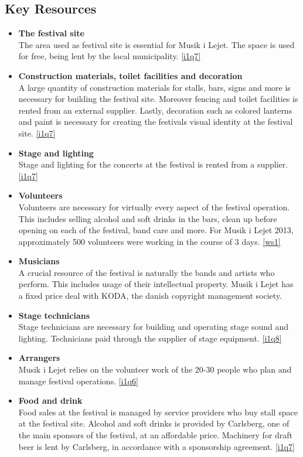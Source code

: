 \subsection{Key Resources} %
\label{sub:key_resources}
\begin{itemize}
	\item \textbf{The festival site}\\
	The area used as festival site is essential for Musik i Lejet. The space is used for free, being lent by the local municipality. \ref{i1q7}
	\item \textbf{Construction materials, toilet facilities and decoration}\\ 
	A large quantity of construction materials for stalls, bars, signs and more is necessary for building the festival site. Moreover fencing and toilet facilities is rented from an external supplier. Lastly, decoration such as colored lanterns and paint is necessary for creating the festivals visual identity at the festival site. \ref{i1q7}
	\item \textbf{Stage and lighting}\\
	Stage and lighting for the concerts at the festival is rented from a supplier. \ref{i1q7}
	\item \textbf{Volunteers}\\
	Volunteers are necessary for virtually every aspect of the festival operation. This includes selling alcohol and soft drinks in the bars, clean up before opening on each of the festival, band care and more. For Musik i Lejet 2013, approximately 500 volunteers were working in the course of 3 days. \ref{ws1}
	\item \textbf{Musicians}\\
	A crucial resource of the festival is naturally the bands and artists who perform. This includes usage of their intellectual property. Musik i Lejet has a fixed price deal with KODA, the danish copyright management society.
	\item \textbf{Stage technicians}\\
	Stage technicians are necessary for building and operating stage sound and lighting. Technicians paid through the supplier of stage equipment. \ref{i1q8}
	\item \textbf{Arrangers}\\
	Musik i Lejet relies on the volunteer work of the 20-30 people who plan and manage festival operations. \ref{i1q6}
	\item \textbf{Food and drink}\\
	Food sales at the festival is managed by service providers who buy stall space at the festival site. Alcohol and soft drinks is provided by Carlsberg, one of the main sponsors of the festival, at an affordable price. Machinery for draft beer is lent by Carlsberg, in accordance with a sponsorship agreement. \ref{i1q7}

\end{itemize}
